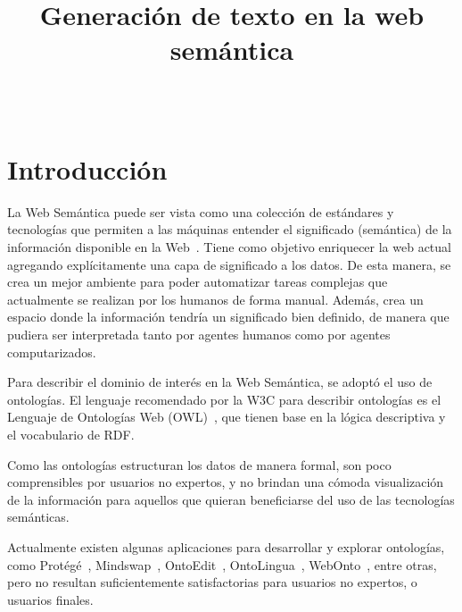 \documentclass[11pt,a4paper,spanish]{book}
\begin{document}
	
\title{Generación de texto en la web semántica}
\author{\ }
\date{}
\maketitle

\frontmatter
\tableofcontents
\mainmatter

\chapter{Introducción}
La Web Semántica puede ser vista como una colección de estándares y tecnologías que permiten a las máquinas entender el significado (semántica) de la información disponible en la Web~\cite{yu2011developer}. Tiene como objetivo enriquecer la web actual agregando explícitamente una capa de significado a los datos. De esta manera, se crea un mejor ambiente para poder automatizar tareas complejas que actualmente se realizan por los humanos de forma manual. Además, crea un espacio donde la información tendría un significado bien definido, de manera que pudiera ser interpretada tanto por agentes humanos como por agentes computarizados.

Para describir el dominio de interés en la Web Semántica, se adoptó el uso de ontologías. El lenguaje recomendado por la W3C para describir ontologías es el Lenguaje de Ontologías Web (OWL)~\cite{RecomendW3C}, que tienen base en la lógica descriptiva y el vocabulario de RDF.

Como las ontologías estructuran los datos de manera formal, son poco comprensibles por usuarios no expertos, y no brindan una cómoda visualización de la información para aquellos que quieran beneficiarse del uso de las tecnologías semánticas.

Actualmente existen algunas aplicaciones para  desarrollar y explorar ontologías, como Protégé~\cite{protege}, Mindswap~\cite{golbeck2002new}, OntoEdit~\cite{sure2002ontoedit}, OntoLingua~\cite{farquhar1997ontolingua}, WebOnto~\cite{domingue1998tadzebao}, entre otras, pero no resultan suficientemente satisfactorias para usuarios no expertos, o usuarios finales. 
\end{document}
